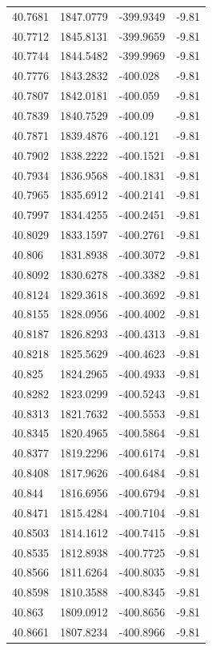 \begin{table}[H]
\begin{tabular}{llll}
40.7681 & 1847.0779 & -399.9349 & -9.81 \\
40.7712 & 1845.8131 & -399.9659 & -9.81 \\
40.7744 & 1844.5482 & -399.9969 & -9.81 \\
40.7776 & 1843.2832 & -400.028 & -9.81 \\
40.7807 & 1842.0181 & -400.059 & -9.81 \\
40.7839 & 1840.7529 & -400.09 & -9.81 \\
40.7871 & 1839.4876 & -400.121 & -9.81 \\
40.7902 & 1838.2222 & -400.1521 & -9.81 \\
40.7934 & 1836.9568 & -400.1831 & -9.81 \\
40.7965 & 1835.6912 & -400.2141 & -9.81 \\
40.7997 & 1834.4255 & -400.2451 & -9.81 \\
40.8029 & 1833.1597 & -400.2761 & -9.81 \\
40.806 & 1831.8938 & -400.3072 & -9.81 \\
40.8092 & 1830.6278 & -400.3382 & -9.81 \\
40.8124 & 1829.3618 & -400.3692 & -9.81 \\
40.8155 & 1828.0956 & -400.4002 & -9.81 \\
40.8187 & 1826.8293 & -400.4313 & -9.81 \\
40.8218 & 1825.5629 & -400.4623 & -9.81 \\
40.825 & 1824.2965 & -400.4933 & -9.81 \\
40.8282 & 1823.0299 & -400.5243 & -9.81 \\
40.8313 & 1821.7632 & -400.5553 & -9.81 \\
40.8345 & 1820.4965 & -400.5864 & -9.81 \\
40.8377 & 1819.2296 & -400.6174 & -9.81 \\
40.8408 & 1817.9626 & -400.6484 & -9.81 \\
40.844 & 1816.6956 & -400.6794 & -9.81 \\
40.8471 & 1815.4284 & -400.7104 & -9.81 \\
40.8503 & 1814.1612 & -400.7415 & -9.81 \\
40.8535 & 1812.8938 & -400.7725 & -9.81 \\
40.8566 & 1811.6264 & -400.8035 & -9.81 \\
40.8598 & 1810.3588 & -400.8345 & -9.81 \\
40.863 & 1809.0912 & -400.8656 & -9.81 \\
40.8661 & 1807.8234 & -400.8966 & -9.81 \\

\end{tabular}
\end{table}
